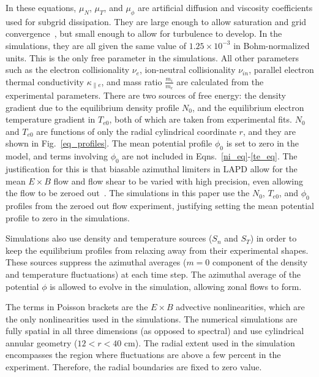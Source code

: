 \documentclass[showpacs,preprintnumbers,amsmath,amssymb,superscriptaddress,aip]{revtex4-1}
\newcommand{\nue}{\nu_{e}}
\newcommand{\nuin}{\nu_{in}}
\newcommand{\kpe}{\kappa_{\parallel e}}
\newcommand{\fmie}{\frac{m_i}{m_e}}
\begin{document}
In these equations, $\mu_N$, $\mu_T$, and $\mu_\phi$ are artificial diffusion and viscosity coefficients used for subgrid dissipation. They are large enough to allow saturation
and grid convergence~\cite{friedman2012}, but small enough to allow for turbulence to develop. In the simulations, they are all given the same value of $1.25 \times 10^{-3}$ in Bohm-normalized units. 
This is the only free parameter in the simulations. All other parameters such as the electron collisionality $\nue$, ion-neutral
collisionality $\nuin$, parallel electron thermal conductivity $\kpe$, and mass ratio $\fmie$ are calculated from the experimental parameters.
There are two sources of free energy: the density gradient due to the equilibrium density profile $N_0$, and the equilibrium electron temperature gradient in $T_{e0}$, both of which are
taken from experimental fits. $N_0$ and $T_{e0}$ are functions of only the radial cylindrical coordinate $r$, and they are shown in Fig.~\ref{eq_profiles}. 
The mean potential profile $\phi_0$ is set to zero in the model, and terms involving $\phi_0$ are not included in Eqns.~\ref{ni_eq}-\ref{te_eq}. 
The justification for this is that biasable azimuthal limiters in LAPD allow for the mean $E \times B$ flow and flow shear to be varied with high precision, even allowing the flow to be
zeroed out~\cite{schaffner2012}. 
The simulations in this paper use the $N_0$, $T_{e0}$, and $\phi_0$ profiles from the zeroed out flow experiment, justifying setting the mean potential profile to zero in the simulations.

Simulations also use density and temperature sources ($S_n$ and $S_T$) in order to keep the equilibrium profiles from relaxing away from their experimental shapes. 
These sources suppress the azimuthal averages ($m=0$ component of the density and temperature fluctuations) at each time step. 
The azimuthal average of the potential $\phi$ is allowed to evolve in
the simulation, allowing zonal flows to form.

The terms in Poisson brackets are the $E \times B$ advective nonlinearities, which are the only nonlinearities used in the simulations.
The numerical simulations are fully spatial in all three dimensions (as opposed to spectral) and use cylindrical annular geometry ($12<r<40$ cm). The radial extent used in the simulation
encompasses the region where fluctuations are above a few percent in the experiment. Therefore, the radial boundaries are fixed to zero value.
\end{document}
